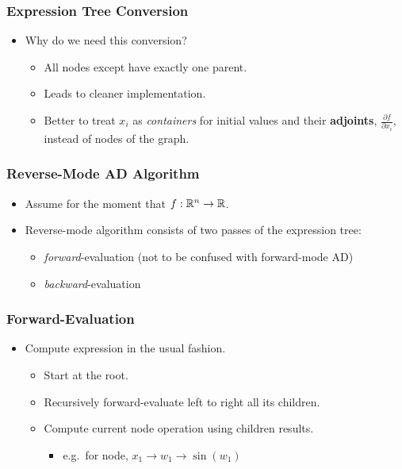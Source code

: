 \begin{frame}
\frametitle{Expression Tree Conversion}

\begin{itemize}

\item{Why do we need this conversion?}
    \begin{itemize}
        \item All nodes except  have exactly one parent.
        \item Leads to cleaner implementation.
        \item Better to treat $x_i$ as \emph{containers} for 
            initial values and their \textbf{adjoints}, $\frac{\partial f}{\partial x_i}$,
            instead of nodes of the graph.
    \end{itemize}

\end{itemize}
\end{frame}

\begin{frame}
\frametitle{Reverse-Mode AD Algorithm}
\begin{itemize}

\item Assume for the moment that $f: \mathbb{R}^n \to \mathbb{R}$.

\item Reverse-mode algorithm consists of two passes of the expression tree:
    \begin{itemize}
        \item \emph{forward}-evaluation (not to be confused with forward-mode AD) 
        \item \emph{backward}-evaluation
    \end{itemize}

\end{itemize}
\end{frame}

\begin{frame}
\frametitle{Forward-Evaluation}
\begin{itemize}

\item Compute expression in the usual fashion.
    \begin{itemize}
        \item Start at the root.
        \item Recursively forward-evaluate left to right all its children.
        \item Compute current node operation using children results.
            \begin{itemize}
                \item e.g.\ for  node, $x_1 \to w_1 \to \sin(w_1)$ 
            \end{itemize}
    \end{itemize}

\end{itemize}
\end{frame}

